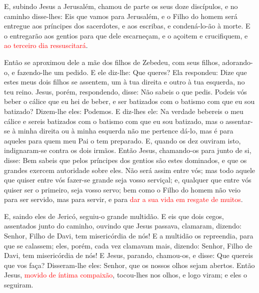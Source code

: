 E, subindo Jesus a Jerusalém, chamou de parte os seus doze
discípulos, e no caminho disse-lhes: Eis que vamos para
Jerusalém, e o Filho do homem será entregue aos príncipes dos
sacerdotes, e aos escribas, e condená-lo-ão à morte. E o
entregarão aos gentios para que dele escarneçam, e o açoitem e
crucifiquem, e \textcolor{red}{ao terceiro dia ressuscitará}.

Então se aproximou dele a mãe dos filhos de Zebedeu, com seus
filhos, adorando-o, e fazendo-lhe um pedido. E ele diz-lhe:
Que queres? Ela respondeu: Dize que estes meus dois filhos se
assentem, um à tua direita e outro à tua esquerda, no teu reino.
Jesus, porém, respondendo, disse: Não sabeis o que pedis.
Podeis vós beber o cálice que eu hei de beber, e ser batizados com o
batismo com que eu sou batizado? Dizem-lhe eles: Podemos. E
diz-lhes ele: Na verdade bebereis o meu cálice e sereis batizados
com o batismo com que eu sou batizado, mas o assentar-se à minha
direita ou à minha esquerda não me pertence dá-lo, mas é para
aqueles para quem meu Pai o tem preparado. E, quando os dez
ouviram isto, indignaram-se contra os dois irmãos. Então
Jesus, chamando-os para junto de si, disse: Bem sabeis que pelos
príncipes dos gentios são estes dominados, e que os grandes exercem
autoridade sobre eles. Não será assim entre vós; mas todo
aquele que quiser entre vós fazer-se grande seja vosso serviçal;
e, qualquer que entre vós quiser ser o primeiro, seja vosso
servo; bem como o Filho do homem não veio para ser servido,
mas para servir, e para \textcolor{red}{dar a sua vida em resgate de
muitos}.

E, saindo eles de Jericó, seguiu-o grande multidão. E eis
que dois cegos, assentados junto do caminho, ouvindo que Jesus
passava, clamaram, dizendo: Senhor, Filho de Davi, tem misericórdia
de nós! E a multidão os repreendia, para que se calassem;
eles, porém, cada vez clamavam mais, dizendo: Senhor, Filho de Davi,
tem misericórdia de nós! E Jesus, parando, chamou-os, e
disse: Que quereis que vos faça? Disseram-lhe eles: Senhor,
que os nossos olhos sejam abertos. Então Jesus,
\textcolor{red}{movido de íntima compaixão}, tocou-lhes nos olhos, e logo
viram; e eles o seguiram.

\medskip

